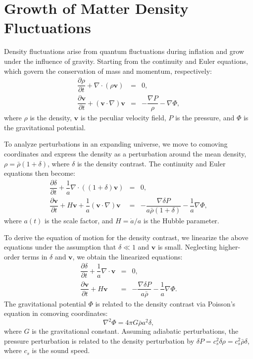 \section{Growth of Matter Density Fluctuations}
Density fluctuations arise from quantum fluctuations during inflation and grow under the influence of gravity. 
Starting from the continuity and Euler equations, which govern the conservation of mass and momentum, respectively:
\begin{eqnarray}
    \label{eq:continuity_equation}
    \dfrac{\partial \rho}{\partial t} + \nabla \cdot (\rho \boldsymbol{v}) &=& 0, \\[2ex]
    \label{eq:euler_equation}
    \dfrac{\partial \boldsymbol{v}}{\partial t} + (\boldsymbol{v} \cdot \nabla) \boldsymbol{v} &=& -\dfrac{\nabla P}{\rho} - \nabla \Phi,
\end{eqnarray}
where \( \rho \) is the density, \( \boldsymbol{v} \) is the peculiar velocity field, \( P \) is the pressure, and \( \Phi \) is the gravitational potential.

To analyze perturbations in an expanding universe, we move to comoving coordinates and express the density as a perturbation around the mean density, \( \rho = \bar{\rho}(1 + \delta) \), where \( \delta \) is the density contrast. The continuity and Euler equations then become:
\begin{eqnarray}
    \label{eq:continuity_equation_rewritten}
    \dfrac{\partial \delta}{\partial t} + \dfrac{1}{a} \nabla \cdot \left( (1 + \delta) \boldsymbol{v} \right) &=& 0, \\[2ex]
    \label{eq:euler_equation_rewritten}
    \dfrac{\partial \boldsymbol{v}}{\partial t} + H \boldsymbol{v} + \dfrac{1}{a} (\boldsymbol{v} \cdot \nabla) \boldsymbol{v} &=& -\dfrac{\nabla \delta P}{a \bar{\rho} (1 + \delta)} - \dfrac{1}{a} \nabla \Phi,
\end{eqnarray}
where \( a(t) \) is the scale factor, and \( H = \dot{a}/a \) is the Hubble parameter.

To derive the equation of motion for the density contrast, we linearize the above equations under the assumption that \( \delta \ll 1 \) and \( \boldsymbol{v} \) is small. Neglecting higher-order terms in \( \delta \) and \( \boldsymbol{v} \), we obtain the linearized equations:
\begin{eqnarray}
    \label{eq:linear_continuity}
    \dfrac{\partial \delta}{\partial t} + \dfrac{1}{a} \nabla \cdot \boldsymbol{v} &=& 0, \\[2ex]
    \label{eq:linear_euler}
    \dfrac{\partial \boldsymbol{v}}{\partial t} + H \boldsymbol{v} &=& -\dfrac{\nabla \delta P}{a \bar{\rho}} - \dfrac{1}{a} \nabla \Phi.
\end{eqnarray}
The gravitational potential \( \Phi \) is related to the density contrast via Poisson's equation in comoving coordinates:
\begin{equation}
    \label{eq:poisson_equation}
    \nabla^2 \Phi = 4\pi G \bar{\rho} a^2 \delta,
\end{equation}
where \( G \) is the gravitational constant.
Assuming adiabatic perturbations, the pressure perturbation is related to the density perturbation by \( \delta P = c_s^2 \delta \rho = c_s^2 \bar{\rho} \delta \), where \( c_s \) is the sound speed.

